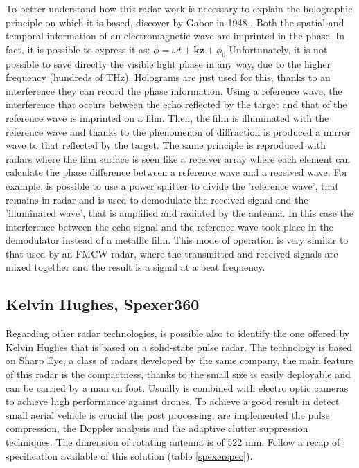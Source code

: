 To better understand how this radar work is necessary to explain the holographic principle on which it is based, discover by Gabor in 1948 \cite{holographic}. Both the spatial and temporal information of an electromagnetic wave are imprinted in the phase. In fact, it is possible to express it as: $\phi=\omega t+\boldsymbol{k} \boldsymbol{z}+\phi_{0}$
Unfortunately, it is not possible to save directly the visible light phase in any way, due to the higher frequency (hundreds of THz). Holograms are just used for this, thanks to an interference they can record the phase information. Using a reference wave, the interference that occurs between the echo reflected by the target and that of the reference wave is imprinted on a film. Then, the film is illuminated with the reference wave and thanks to the phenomenon of diffraction is produced a mirror wave to that reflected by the target. The same principle is reproduced with radars where the film surface is seen like a receiver array where each element can calculate the phase difference between a reference wave and a received wave. For example, is possible to use a power splitter to divide the 'reference wave', that remains in radar and is used to demodulate the received signal and the 'illuminated wave', that is amplified and radiated by the antenna. In this case the interference between the echo signal and the reference wave took place in the demodulator instead of a metallic film. This mode of operation is very similar to that used by an FMCW radar, where the transmitted and received signals are mixed together and the result is a signal at a beat frequency.

\subsection{Kelvin Hughes, Spexer360}
Regarding other radar technologies, is possible also to identify the one offered by Kelvin Hughes that is based on a solid-state pulse radar. The technology is based on Sharp Eye, a class of radars developed by the same company, the main feature of this radar is the compactness, thanks to the small size is easily deployable and can be carried by a man on foot. Usually is combined with electro optic cameras to achieve high performance against drones. To achieve a good result in detect small aerial vehicle is crucial the post processing, are implemented the pulse compression, the Doppler analysis and the adaptive clutter suppression techniques. The dimension of rotating antenna is of 522 mm. Follow a recap of specification available of this solution (table \ref{spexerspec}).


